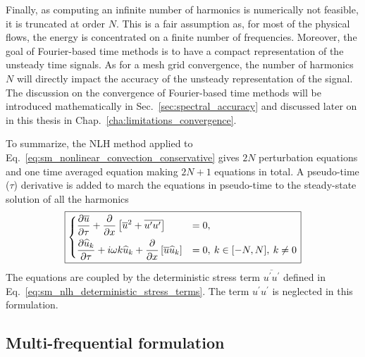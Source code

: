 Finally, as computing an infinite number of harmonics is 
numerically not feasible,
it is truncated at order $N$. 
This is a fair assumption as, for most
of the physical flows, the energy
is concentrated on a finite number of frequencies.
Moreover, the goal of Fourier-based time
methods is to have a compact representation of the unsteady time
signals.
As for a mesh grid convergence, the number of harmonics $N$
will directly impact the accuracy of the unsteady representation
of the signal.
The discussion on the
convergence of Fourier-based time methods will be introduced mathematically
in Sec.~\ref{sec:spectral_accuracy} and discussed later on in this 
thesis in Chap.~\ref{cha:limitations_convergence}.

To summarize, the NLH
method applied to Eq.~\eqref{eq:sm_nonlinear_convection_conservative}
gives $2N$ perturbation equations and one time
averaged equation making $2N+1$ equations in total. 
A pseudo-time ($\tau$) derivative is
added to march the equations in pseudo-time to the steady-state 
solution of all the harmonics
\begin{equation}
	\fbox{$
	\begin{dcases}
		\frac{\partial \overline{u}}{\partial \tau} + 
		\frac{\partial}{\partial x}
			\left[\overline{u}^2 + 
			\overline{u^\prime u^\prime}\right] &=
			0, \\
		\frac{\partial \widehat{u}_k}{\partial \tau} + 
		i \omega k \widehat{u}_k + 
			\frac{\partial}{\partial x} 
			\left[ \overline{u} \widehat{u}_k\right] &= 
			0, \: k \in [-N, N], \: k \neq 0
	\end{dcases}
	$}
	\label{eq:sm_nlh_subset_eq}
\end{equation}
The equations are coupled by the deterministic 
stress term $\overline{u^\prime u^\prime}$
defined in Eq.~\eqref{eq:sm_nlh_deterministic_stress_terms}.
The term $u^\prime u^\prime$ is neglected in this formulation.

\subsection{Multi-frequential formulation}

